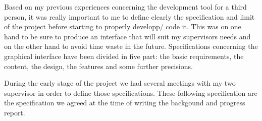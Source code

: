 Based on my previous experiences concerning the development tool for a third person, it was really important to me to define clearly the specification and limit of the project before starting to properly developp/ code it. This was on one hand to be sure to produce an interface that will suit my supervisors needs and on the other hand to avoid time waste in the future. Specifications concerning the graphical interface have been divided in five part: the basic requirements, the content, the design, the features and some further precisions. 

\newline \vspace{5mm}

During the early stage of the project we had several meetings with my two supervisor in order to define those specifications. These following specification are the specification we agreed at the time of writing the backgound and progress report.

\newline \vspace{5mm}



